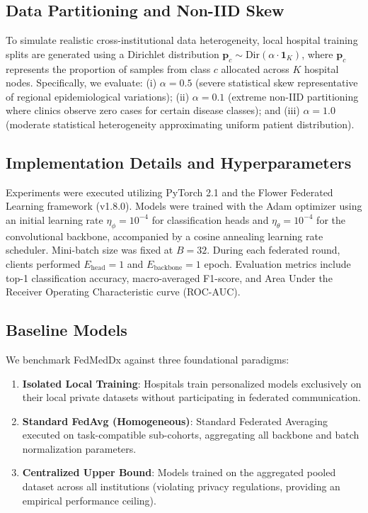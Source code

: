 \documentclass[conference]{IEEEtran}
\newcommand{\compactitems}{%
  \setlength{\itemsep}{1.2pt}%
  \setlength{\parskip}{0pt}%
  \setlength{\parsep}{0pt}%
  \setlength{\topsep}{2pt}%
  \setlength{\partopsep}{0pt}%
}
\begin{document}
\subsection{Data Partitioning and Non-IID Skew}
To simulate realistic cross-institutional data heterogeneity, local hospital training splits are generated using a Dirichlet distribution $\mathbf{p}_c \sim \text{Dir}(\alpha \cdot \mathbf{1}_K)$, where $\mathbf{p}_c$ represents the proportion of samples from class $c$ allocated across $K$ hospital nodes. Specifically, we evaluate: (i) $\alpha = 0.5$ (severe statistical skew representative of regional epidemiological variations); (ii) $\alpha = 0.1$ (extreme non-IID partitioning where clinics observe zero cases for certain disease classes); and (iii) $\alpha = 1.0$ (moderate statistical heterogeneity approximating uniform patient distribution).

\subsection{Implementation Details and Hyperparameters}
Experiments were executed utilizing PyTorch 2.1 and the Flower Federated Learning framework (v1.8.0). Models were trained with the Adam optimizer using an initial learning rate $\eta_\phi = 10^{-4}$ for classification heads and $\eta_\theta = 10^{-4}$ for the convolutional backbone, accompanied by a cosine annealing learning rate scheduler. Mini-batch size was fixed at $B = 32$. During each federated round, clients performed $E_{\text{head}} = 1$ and $E_{\text{backbone}} = 1$ epoch. Evaluation metrics include top-1 classification accuracy, macro-averaged F1-score, and Area Under the Receiver Operating Characteristic curve (ROC-AUC).

\subsection{Baseline Models}
We benchmark FedMedDx against three foundational paradigms:
\begin{enumerate}\compactitems
    \item \textbf{Isolated Local Training}: Hospitals train personalized models exclusively on their local private datasets without participating in federated communication.
    \item \textbf{Standard FedAvg (Homogeneous)}: Standard Federated Averaging executed on task-compatible sub-cohorts, aggregating all backbone and batch normalization parameters.
    \item \textbf{Centralized Upper Bound}: Models trained on the aggregated pooled dataset across all institutions (violating privacy regulations, providing an empirical performance ceiling).
\end{enumerate}
\end{document}
